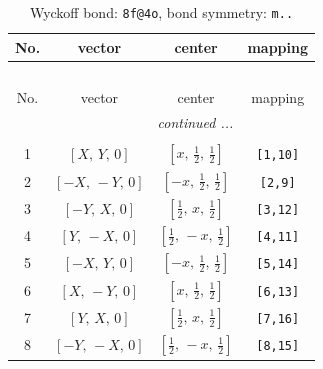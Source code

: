 \documentclass[fleqn,8pt]{jsarticle}
\begin{document}
\begin{longtable}{cccc}
\caption{Wyckoff bond: {\tt 8f@4o}, bond symmetry: {\tt m..}}
 \\
 \hline \hline
No. & vector & center & mapping \\ \hline \endfirsthead

\multicolumn{3}{l}{\tablename\ \thetable{}} \\
 \hline \hline
No. & vector & center & mapping \\ \hline \endhead

 \hline \hline
\multicolumn{3}{r}{\footnotesize\it continued ...} \\ \endfoot

 \hline \hline
\multicolumn{3}{r}{} \\ \endlastfoot

1 & $\left[ X,\, Y,\, 0 \right]$ & $\left[ x,\, \frac{1}{2},\, \frac{1}{2} \right]$ & {\tt [1,10]} \\ \hline
2 & $\left[ - X,\, - Y,\, 0 \right]$ & $\left[ - x,\, \frac{1}{2},\, \frac{1}{2} \right]$ & {\tt [2,9]} \\ \hline
3 & $\left[ - Y,\, X,\, 0 \right]$ & $\left[ \frac{1}{2},\, x,\, \frac{1}{2} \right]$ & {\tt [3,12]} \\ \hline
4 & $\left[ Y,\, - X,\, 0 \right]$ & $\left[ \frac{1}{2},\, - x,\, \frac{1}{2} \right]$ & {\tt [4,11]} \\ \hline
5 & $\left[ - X,\, Y,\, 0 \right]$ & $\left[ - x,\, \frac{1}{2},\, \frac{1}{2} \right]$ & {\tt [5,14]} \\ \hline
6 & $\left[ X,\, - Y,\, 0 \right]$ & $\left[ x,\, \frac{1}{2},\, \frac{1}{2} \right]$ & {\tt [6,13]} \\ \hline
7 & $\left[ Y,\, X,\, 0 \right]$ & $\left[ \frac{1}{2},\, x,\, \frac{1}{2} \right]$ & {\tt [7,16]} \\ \hline
8 & $\left[ - Y,\, - X,\, 0 \right]$ & $\left[ \frac{1}{2},\, - x,\, \frac{1}{2} \right]$ & {\tt [8,15]} \\
\end{longtable}
\renewcommand{\arraystretch}{1.2}
\end{document}
